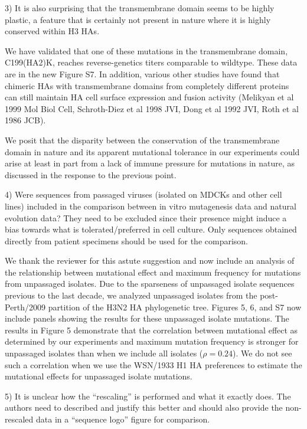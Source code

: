 \documentclass[11pt, oneside]{article}   	%
\newcommand{\response}[1]{{\color{black}#1}}
\begin{document}
3) It is also surprising that the transmembrane domain seems to be highly plastic, a feature that is certainly not present in nature where it is highly conserved within H3 HAs. 

\response{We have validated that one of these mutations in the transmembrane domain, C199(HA2)K, reaches reverse-genetics titers comparable to wildtype.
These data are in the new Figure S7.
In addition, various other studies have found that chimeric HAs with transmembrane domains from completely different proteins can still maintain HA cell surface expression and fusion activity (Melikyan et al 1999 Mol Biol Cell, Schroth-Diez et al 1998 JVI, Dong et al 1992 JVI, Roth et al 1986 JCB).

We posit that the disparity between the conservation of the transmembrane domain in nature and its apparent mutational tolerance in our experiments could arise at least in part from a lack of immune pressure for mutations in nature, as discussed in the response to the previous point.
}

4) Were sequences from passaged viruses (isolated on MDCKs and other cell lines) included in the comparison between in vitro mutagenesis data and natural evolution data? They need to be excluded since their presence might induce a bias towards what is tolerated/preferred in cell culture. Only sequences obtained directly from patient specimens should be used for the comparison. 

\response{We thank the reviewer for this astute suggestion and now include an analysis of the relationship between mutational effect and maximum frequency for mutations from unpassaged isolates.
Due to the sparseness of unpassaged isolate sequences previous to the last decade, we analyzed unpassaged isolates from the post-Perth/2009 partition of the H3N2 HA phylogenetic tree.
Figures 5, 6, and S7 now include panels showing the results for these unpassaged isolate mutations.
The results in Figure 5 demonstrate that the correlation between mutational effect as determined by our experiments and maximum mutation frequency is stronger for unpassaged isolates than when we include all isolates ($\rho = 0.24$).
We do not see such a correlation when we use the WSN/1933 H1 HA preferences to estimate the mutational effects for unpassaged isolate mutations.
}

5) It is unclear how the ``rescaling'' is performed and what it exactly does. The authors need to described and justify this better and should also provide the non-rescaled data in a ``sequence logo'' figure for comparison. 
\end{document}
